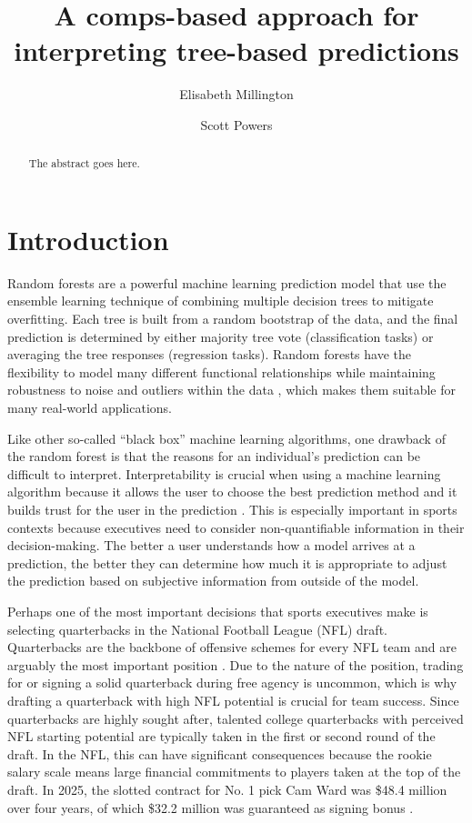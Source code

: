 \documentclass{article}
\title{A comps-based approach for interpreting tree-based predictions}
\author[1]{Elisabeth Millington}
\author[2]{Scott Powers}
\affil[1]{Department of Kinesiology, Rice University}
\affil[2]{Department of Sport Management, Rice University}
\begin{document}
\maketitle

\begin{abstract}
  The abstract goes here.
\end{abstract}

\section{Introduction}

Random forests are a powerful machine learning prediction model that use the ensemble learning technique of combining multiple decision trees to mitigate overfitting. Each tree is built from a random bootstrap of the data, and the final prediction is determined by either majority tree vote (classification tasks) or averaging the tree responses (regression tasks). Random forests have the flexibility to model many different functional relationships while maintaining robustness to noise and outliers within the data \citep{breiman_random_2001}, which makes them suitable for many real-world applications.

Like other so-called ``black box'' machine learning algorithms, one drawback of the random forest is that the reasons for an individual's prediction can be difficult to interpret. Interpretability is crucial when using a machine learning algorithm because it allows the user to choose the best prediction method and it builds trust for the user in the prediction \citep{ribeiro_why_2016}. This is especially important in sports contexts because executives need to consider non-quantifiable information in their decision-making. The better a user understands how a model arrives at a prediction, the better they can determine how much it is appropriate to adjust the prediction based on subjective information from outside of the model.

Perhaps one of the most important decisions that sports executives make is selecting quarterbacks in the National Football League (NFL) draft. Quarterbacks are the backbone of offensive schemes for every NFL team and are arguably the most important position \citep{hughes_positional_2015}. Due to the nature of the position, trading for or signing a solid quarterback during free agency is uncommon, which is why drafting a quarterback with high NFL potential is crucial for team success. Since quarterbacks are highly sought after, talented college quarterbacks with perceived NFL starting potential are typically taken in the first or second round of the draft. In the NFL, this can have significant consequences because the rookie salary scale means large financial commitments to players taken at the top of the draft. In 2025, the slotted contract for No. 1 pick Cam Ward was \$48.4 million over four years, of which \$32.2 million was guaranteed as signing bonus \citep{badenhausen_nfl_2025}.
\end{document}
